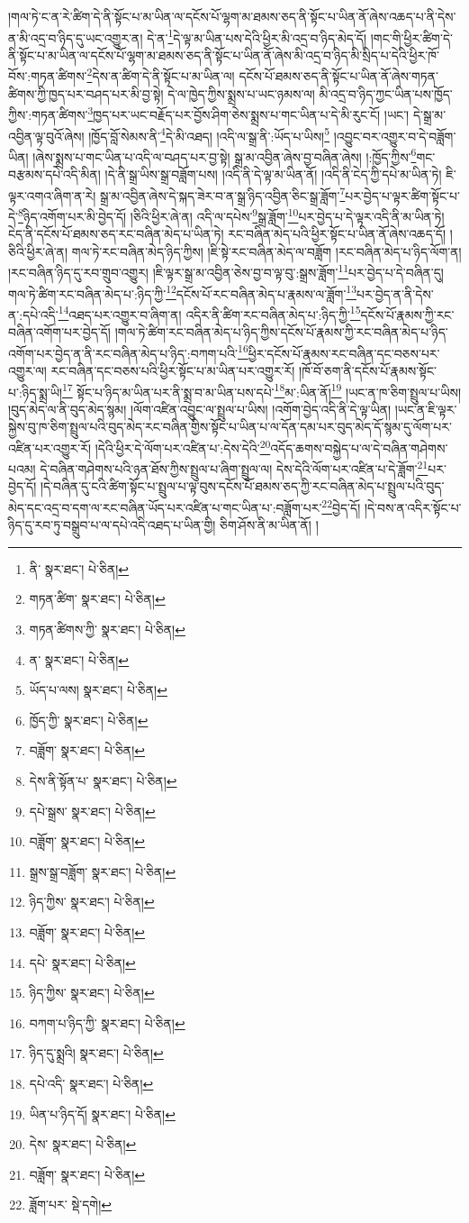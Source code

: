 །གལ་ཏེ་ང་ན་རེ་ཚིག་དེ་ནི་སྟོང་པ་མ་ཡིན་ལ་དངོས་པོ་ལྷག་མ་ཐམས་ཅད་ནི་སྟོང་པ་ཡིན་ནོ་ཞེས་འཆད་པ་ནི་དེས་ན་མི་འདྲ་བ་ཉིད་དུ་ཡང་འགྱུར་ན། དེ་ན་\footnote{ནི་  སྣར་ཐང་།  པེ་ཅིན། }དེ་ལྟ་མ་ཡིན་པས་དེའི་ཕྱིར་མི་འདྲ་བ་ཉིད་མེད་དོ། །གང་གི་ཕྱིར་ཚིག་དེ་ནི་སྟོང་པ་མ་ཡིན་ལ་དངོས་པོ་ལྷག་མ་ཐམས་ཅད་ནི་སྟོང་པ་ཡིན་ནོ་ཞེས་མི་འདྲ་བ་ཉིད་མི་སྲིད་པ་དེའི་ཕྱིར་ཁོ་བོས་:གཏན་ཚིགས་\footnote{གཏན་ཚིག་  སྣར་ཐང་།  པེ་ཅིན། }དེས་ན་ཚིག་དེ་ནི་སྟོང་པ་མ་ཡིན་ལ། དངོས་པོ་ཐམས་ཅད་ནི་སྟོང་པ་ཡིན་ནོ་ཞེས་གཏན་ཚིགས་ཀྱི་ཁྱད་པར་བཤད་པར་མི་བྱ་སྟེ། དེ་ལ་ཁྱེད་ཀྱིས་སྨྲས་པ་ཡང་ཉམས་ལ། མི་འདྲ་བ་ཉིད་ཀྱང་ཡིན་པས་ཁྱོད་ཀྱིས་:གཏན་ཚིགས་\footnote{གཏན་ཚིགས་ཀྱི་  སྣར་ཐང་།  པེ་ཅིན། }ཁྱད་པར་ཡང་བརྗོད་པར་བྱོས་ཤིག་ཅེས་སྨྲས་པ་གང་ཡིན་པ་དེ་མི་རུང་ངོ། །ཡང་། དེ་སྒྲ་མ་འབྱིན་ལྟ་བུའོ་ཞེས། །ཁྱོད་བློ་སེམས་ནི་\footnote{ན་  སྣར་ཐང་།  པེ་ཅིན། }དེ་མི་འཐད། །འདི་ལ་སྒྲ་ནི་:ཡོད་པ་ཡིས།\footnote{ཡོད་པ་ལས།  སྣར་ཐང་།  པེ་ཅིན། } །འབྱུང་བར་འགྱུར་བ་དེ་བཟློག་ཡིན། །ཞེས་སྨྲས་པ་གང་ཡིན་པ་འདི་ལ་བཤད་པར་བྱ་སྟེ། སྒྲ་མ་འབྱིན་ཞེས་བྱ་བཞིན་ཞེས། །:ཁྱོད་ཀྱིས་\footnote{ཁྱོད་ཀྱི་  སྣར་ཐང་།  པེ་ཅིན། }གང་བརྩམས་དཔེ་འདི་མིན། །དེ་ནི་སྒྲ་ཡིས་སྒྲ་བཟློག་པས། །འདི་ནི་དེ་ལྟ་མ་ཡིན་ནོ། །འདི་ནི་ངེད་ཀྱི་དཔེ་མ་ཡིན་ཏེ། ཇི་ལྟར་འགའ་ཞིག་ན་རེ། སྒྲ་མ་འབྱིན་ཞེས་དེ་སྐད་ཟེར་བ་ན་སྒྲ་ཉིད་འབྱིན་ཅིང་སྒྲ་ཟློག་\footnote{བཟློག་  སྣར་ཐང་།  པེ་ཅིན། }པར་བྱེད་པ་ལྟར་ཚིག་སྟོང་པ་དེ་\footnote{དེས་ནི་སྟོན་པ་  སྣར་ཐང་།  པེ་ཅིན། }ཉིད་འགོག་པར་མི་བྱེད་དོ། །ཅིའི་ཕྱིར་ཞེ་ན། འདི་ལ་དཔེས་\footnote{དཔེ་སྒྲས་  སྣར་ཐང་།  པེ་ཅིན། }སྒྲ་ཟློག་\footnote{བཟློག་  སྣར་ཐང་།  པེ་ཅིན། }པར་བྱེད་པ་དེ་ལྟར་འདི་ནི་མ་ཡིན་ཏེ། ངེད་ནི་དངོས་པོ་ཐམས་ཅད་རང་བཞིན་མེད་པ་ཡིན་ཏེ། རང་བཞིན་མེད་པའི་ཕྱིར་སྟོང་པ་ཡིན་ནོ་ཞེས་འཆད་དོ། །ཅིའི་ཕྱིར་ཞེ་ན། གལ་ཏེ་རང་བཞིན་མེད་ཉིད་ཀྱིས། །ཇི་སྟེ་རང་བཞིན་མེད་ལ་བཟློག །རང་བཞིན་མེད་པ་ཉིད་ལོག་ན། །རང་བཞིན་ཉིད་དུ་རབ་གྲུབ་འགྱུར། །ཇི་ལྟར་སྒྲ་མ་འབྱིན་ཅེས་བྱ་བ་ལྟ་བུ་:སྒྲས་ཟློག་\footnote{སྒྲས་སྒྲ་བཟློག་  སྣར་ཐང་།  པེ་ཅིན། }པར་བྱེད་པ་དེ་བཞིན་དུ། གལ་ཏེ་ཚིག་རང་བཞིན་མེད་པ་:ཉིད་ཀྱི་\footnote{ཉིད་ཀྱིས་  སྣར་ཐང་།  པེ་ཅིན། }དངོས་པོ་རང་བཞིན་མེད་པ་རྣམས་ལ་ཟློག་\footnote{བཟློག་  སྣར་ཐང་།  པེ་ཅིན། }པར་བྱེད་ན་ནི་དེས་ན་:དཔེ་འདི་\footnote{དཔེ་  སྣར་ཐང་།  པེ་ཅིན། }འཐད་པར་འགྱུར་བ་ཞིག་ན། འདིར་ནི་ཚིག་རང་བཞིན་མེད་པ་:ཉིད་ཀྱི་\footnote{ཉིད་ཀྱིས་  སྣར་ཐང་།  པེ་ཅིན། }དངོས་པོ་རྣམས་ཀྱི་རང་བཞིན་འགོག་པར་བྱེད་དོ། །གལ་ཏེ་ཚིག་རང་བཞིན་མེད་པ་ཉིད་ཀྱིས་དངོས་པོ་རྣམས་ཀྱི་རང་བཞིན་མེད་པ་ཉིད་འགོག་པར་བྱེད་ན་ནི་རང་བཞིན་མེད་པ་ཉིད་:བཀག་པའི་\footnote{བཀག་པ་ཉིད་ཀྱི་  སྣར་ཐང་།  པེ་ཅིན། }ཕྱིར་དངོས་པོ་རྣམས་རང་བཞིན་དང་བཅས་པར་འགྱུར་ལ། རང་བཞིན་དང་བཅས་པའི་ཕྱིར་སྟོང་པ་མ་ཡིན་པར་འགྱུར་རོ། །ཁོ་བོ་ཅག་ནི་དངོས་པོ་རྣམས་སྟོང་པ་:ཉིད་སྨྲ་ཡི།\footnote{ཉིད་དུ་སྨྲའི།  སྣར་ཐང་།  པེ་ཅིན། } སྟོང་པ་ཉིད་མ་ཡིན་པར་ནི་སྨྲ་བ་མ་ཡིན་པས་དཔེ་\footnote{དཔེ་འདི་  སྣར་ཐང་།  པེ་ཅིན། }མ་:ཡིན་ནོ།\footnote{ཡིན་པ་ཉིད་དོ།  སྣར་ཐང་།  པེ་ཅིན། } །ཡང་ན་ཁ་ཅིག་སྤྲུལ་པ་ཡིས། །བུད་མེད་ལ་ནི་བུད་མེད་སྙམ། །ལོག་འཛིན་འབྱུང་ལ་སྤྲུལ་པ་ཡིས། །འགོག་བྱེད་འདི་ནི་དེ་ལྟ་ཡིན། །ཡང་ན་ཇི་ལྟར་སྐྱེས་བུ་ཁ་ཅིག་སྤྲུལ་པའི་བུད་མེད་རང་བཞིན་གྱིས་སྟོང་པ་ཡིན་པ་ལ་དོན་དམ་པར་བུད་མེད་དོ་སྙམ་དུ་ལོག་པར་འཛིན་པར་འགྱུར་རོ། །དེའི་ཕྱིར་དེ་ལོག་པར་འཛིན་པ་:དེས་དེའི་\footnote{དེས་  སྣར་ཐང་།  པེ་ཅིན། }འདོད་ཆགས་བསྐྱེད་པ་ལ་དེ་བཞིན་གཤེགས་པའམ། དེ་བཞིན་གཤེགས་པའི་ཉན་ཐོས་ཀྱིས་སྤྲུལ་པ་ཞིག་སྤྲུལ་ལ། དེས་དེའི་ལོག་པར་འཛིན་པ་དེ་ཟློག་\footnote{བཟློག་  སྣར་ཐང་།  པེ་ཅིན། }པར་བྱེད་དོ། །དེ་བཞིན་དུ་ངའི་ཚིག་སྟོང་པ་སྤྲུལ་པ་ལྟ་བུས་དངོས་པོ་ཐམས་ཅད་ཀྱི་རང་བཞིན་མེད་པ་སྤྲུལ་པའི་བུད་མེད་དང་འདྲ་བ་དག་ལ་རང་བཞིན་ཡོད་པར་འཛིན་པ་གང་ཡིན་པ་:བཟློག་པར་\footnote{ཟློག་པར་  སྡེ་དགེ། }བྱེད་དོ། །དེ་བས་ན་འདིར་སྟོང་པ་ཉིད་དུ་རབ་ཏུ་བསྒྲུབ་པ་ལ་དཔེ་འདི་འཐད་པ་ཡིན་གྱི། ཅིག་ཤོས་ནི་མ་ཡིན་ནོ། །
